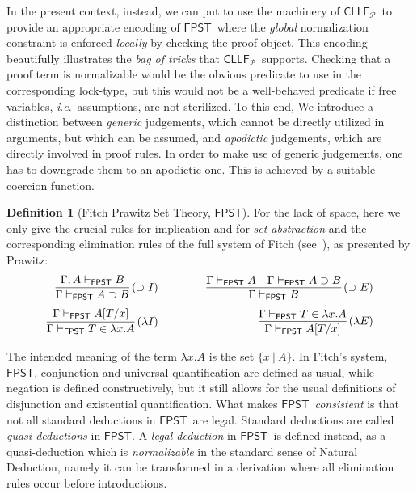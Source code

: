 \documentclass[submission,copyright,creativecommons]{eptcs}
\theoremstyle{plain}
\theoremstyle{definition}
\newtheorem{definition}{Definition}[section]
\newcommand{\CLLFP} {\mbox{$\mathsf{CLLF}_{\mathcal P}$}}
\newcommand{\FPST}   {\mbox{$\mathsf{FPST}$}}
\newcommand {\ie}        {{\textit{i}.\textit{e}.}}
\newcommand{\rew}[1]  {\hspace{-#1mm}}
\newcommand{\fwd}[1]  {\hspace{#1mm}}
\begin{document}
In the present context, instead, we can put to use the machinery of
\CLLFP\ to provide an appropriate encoding of \FPST\ where the
\emph{global} normalization constraint is enforced \emph{locally} by
checking the proof-object. This encoding beautifully illustrates the
\emph{bag of tricks} that \CLLFP\ supports. Checking that a proof term
is normalizable would be the obvious predicate to use in the
corresponding lock-type, but this would not be a well-behaved
predicate if free variables, \ie\ assumptions, are not sterilized.  To
this end, 
We introduce a distinction between \emph{generic}
judgements, which cannot be directly utilized in arguments, but which
can be assumed, and \emph{apodictic} judgements, which are directly
involved in proof rules. In order to make use of generic judgements,
one has to downgrade them to an apodictic one. This is achieved by a
suitable coercion function.

\begin{definition}[Fitch Prawitz Set Theory, \FPST]
  For the lack of space, here we only
  give the crucial rules for implication and for
  \emph{set-abstraction} and the corresponding elimination rules of the full system of Fitch (see~\cite{prawitz}), as presented by
  Prawitz:
$$
  \begin{array}{r@{\fwd{15}}r}
    \rew{5}\infer[\rew{1}(\supset{I})]
    {\Gamma \VDASHFP  A \supset B}
    {\Gamma, A \VDASHFP  B}
    &
    \infer[\rew{1} (\supset{E})]
    {\Gamma \VDASHFP  B}
    {\Gamma \VDASHFP A & \Gamma \VDASHFP  A \supset B  }
    \\[2mm]
    \infer[\rew{1} (\lambda I)]
    { \Gamma \VDASHFP T \in \lambda x. A }
    {\Gamma \VDASHFP A[T/x]}
    &
    \infer[\rew{1} (\lambda E)]
    {\Gamma \VDASHFP A[T/x]}
    { \Gamma \VDASHFP T \in \lambda x. A }
\end{array}
  $$
\end{definition}
\noindent The intended meaning of the term $\lambda x.A$ is the set
$\{x\ |\ A\}$. In Fitch's system, \FPST, conjunction and universal
quantification are defined as usual, while negation is defined
constructively, but it still allows for the usual definitions of
disjunction and existential quantification.  What makes \FPST\
\emph{consistent} is that not all standard deductions in \FPST\ are
legal. Standard deductions are called \emph{quasi-deductions} in
\FPST. A \emph{legal deduction} in \FPST\ is defined instead, as a
quasi-deduction which is \emph{normalizable} in the standard sense of
Natural Deduction, namely it can be transformed in a derivation where
all elimination rules occur before introductions.
\end{document}
